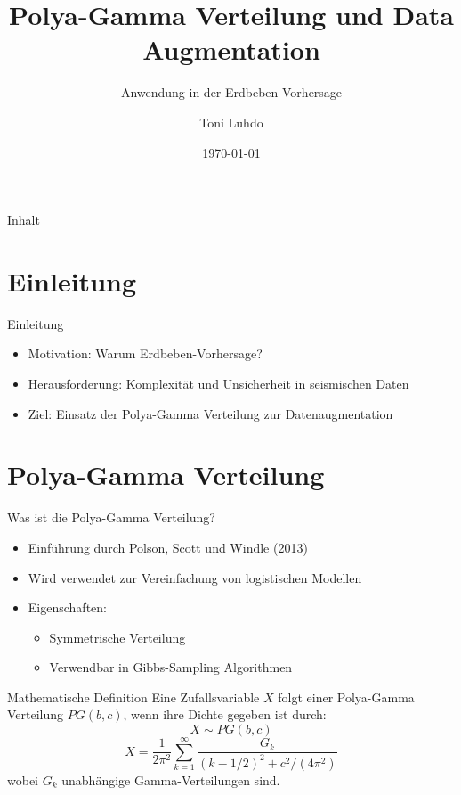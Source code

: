 \documentclass{beamer}
\title{Polya-Gamma Verteilung und Data Augmentation}
\subtitle{Anwendung in der Erdbeben-Vorhersage}
\author{Toni Luhdo}
\date{\today}
\begin{document}
\begin{frame}
  \titlepage
\end{frame}

\begin{frame}{Inhalt}
  \tableofcontents
\end{frame}

\section{Einleitung}
\begin{frame}{Einleitung}
  \begin{itemize}
    \item Motivation: Warum Erdbeben-Vorhersage?
    \item Herausforderung: Komplexität und Unsicherheit in seismischen Daten
    \item Ziel: Einsatz der Polya-Gamma Verteilung zur Datenaugmentation
  \end{itemize}
\end{frame}

\section{Polya-Gamma Verteilung}
\begin{frame}{Was ist die Polya-Gamma Verteilung?}
  \begin{itemize}
    \item Einführung durch Polson, Scott und Windle (2013)
    \item Wird verwendet zur Vereinfachung von logistischen Modellen
    \item Eigenschaften:
    \begin{itemize}
      \item Symmetrische Verteilung
      \item Verwendbar in Gibbs-Sampling Algorithmen
    \end{itemize}
  \end{itemize}
\end{frame}

\begin{frame}{Mathematische Definition}
  Eine Zufallsvariable $X$ folgt einer Polya-Gamma Verteilung $PG(b, c)$, wenn ihre Dichte gegeben ist durch:
  \[ X \sim PG(b, c) \]
  \[ X = \frac{1}{2 \pi^2} \sum_{k=1}^{\infty} \frac{G_k}{(k-1/2)^2 + c^2/(4\pi^2)} \]
  wobei $G_k$ unabhängige Gamma-Verteilungen sind.
\end{frame}
\end{document}

